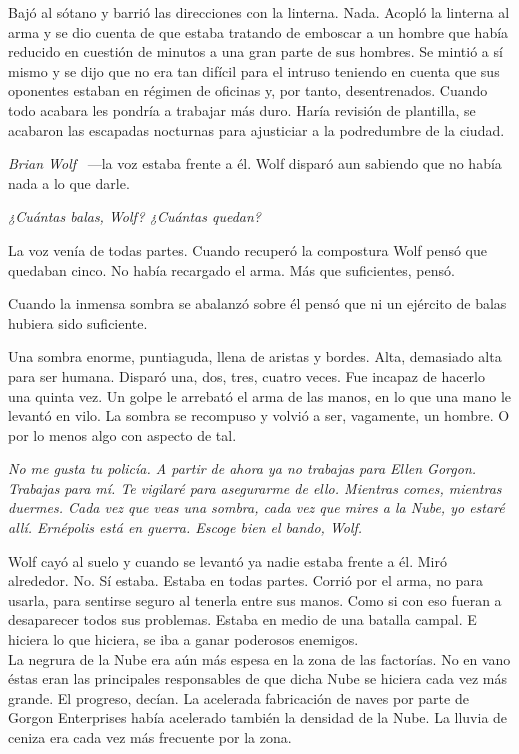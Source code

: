 Bajó al sótano y barrió las direcciones con la linterna. Nada. Acopló la linterna al arma y se dio cuenta de que estaba tratando de emboscar a un hombre que había reducido en cuestión de minutos a una gran parte de sus hombres. Se mintió a sí mismo y se dijo que no era tan difícil para el intruso teniendo en cuenta que sus oponentes estaban en régimen de oficinas y, por tanto, desentrenados. Cuando todo acabara les pondría a trabajar más duro. Haría revisión de plantilla, se acabaron las escapadas nocturnas para ajusticiar a la podredumbre de la ciudad.

\emph{Brian Wolf} ~---la voz estaba frente a él. Wolf disparó aun sabiendo que no había nada a lo que darle.

\emph{¿Cuántas balas, Wolf? ¿Cuántas quedan?}

La voz venía de todas partes. Cuando recuperó la compostura Wolf pensó que quedaban cinco. No había recargado el arma. Más que suficientes, pensó.

Cuando la inmensa sombra se abalanzó sobre él pensó que ni un ejército de balas hubiera sido suficiente.

Una sombra enorme, puntiaguda, llena de aristas y bordes. Alta, demasiado alta para ser humana. Disparó una, dos, tres, cuatro veces. Fue incapaz de hacerlo una quinta vez. Un golpe le arrebató el arma de las manos, en lo que una mano le levantó en vilo. La sombra se recompuso y volvió a ser, vagamente, un hombre. O por lo menos algo con aspecto de tal.

\emph{No me gusta tu policía. A partir de ahora ya no trabajas para Ellen Gorgon. Trabajas para mí. Te vigilaré para asegurarme de ello. Mientras comes, mientras duermes. Cada vez que veas una sombra, cada vez que mires a la Nube, yo estaré allí. Ernépolis está en guerra. Escoge bien el bando, Wolf.}

Wolf cayó al suelo y cuando se levantó ya nadie estaba frente a él. Miró alrededor. No. Sí estaba. Estaba en todas partes. Corrió por el arma, no para usarla, para sentirse seguro al tenerla entre sus manos. Como si con eso fueran a desaparecer todos sus problemas. Estaba en medio de una batalla campal. E hiciera lo que hiciera, se iba a ganar poderosos enemigos.\\

\noindent{}La negrura de la Nube era aún más espesa en la zona de las factorías. No en vano éstas eran las principales responsables de que dicha Nube se hiciera cada vez más grande. El progreso, decían. La acelerada fabricación de naves por parte de Gorgon Enterprises había acelerado también la densidad de la Nube. La lluvia de ceniza era cada vez más frecuente por la zona.

